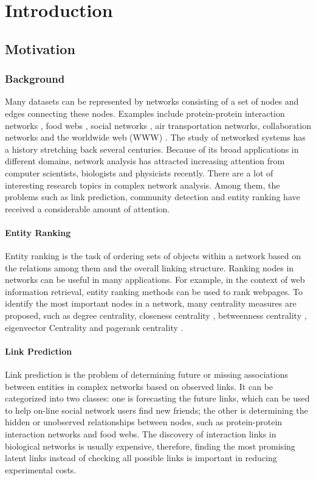 \documentclass[\main/thesis.tex]{subfiles}
\begin{document}
\chapter{Introduction}

\section{Motivation}
\subsection{Background} \label{background}
Many datasets can be represented by networks consisting of a set of nodes and edges connecting these nodes. Examples include protein-protein interaction networks \cite{krogan2006global}, food webs \cite{williams2000simple}, social networks \cite{shetty2004enron}, air transportation networks, collaboration networks \cite{nascimento2003analysis,leskovec2007graph} and the worldwide web (WWW) \cite{albert1999internet,broder2000graph}. The study of networked systems has a history stretching back several centuries. Because of its broad applications in different domains, network analysis has attracted increasing attention from computer scientists, biologists and physicists recently. There are a lot of interesting research topics in complex network analysis. Among them, the problems such as link prediction, community detection and entity ranking have received a considerable amount of attention.

\subsubsection{Entity Ranking}
Entity ranking is the task of ordering sets of objects within a network based on the relations among them and the overall linking structure. Ranking nodes in networks can be useful in many applications. For example, in the context of web information retrieval, entity ranking methods can be used to rank webpages. To identify the most important nodes in a network, many centrality measures are proposed, such as degree centrality, closeness centrality \cite{freeman1978centrality}, betweenness centrality \cite{freeman1977set}, eigenvector Centrality \cite{bonacich1987power} and pagerank centrality \cite{page1999pagerank}.

\subsubsection{Link Prediction}
Link prediction is the problem of determining future or missing associations between entities in complex networks based on observed links. It can be categorized into two classes: one is forecasting the future links, which can be used to help on-line social network users find new friends; the other is determining the hidden or unobserved relationships between nodes, such as protein-protein interaction networks and food webs. The discovery of interaction links in biological networks is usually expensive, therefore, finding the most promising latent links instead of checking all possible links is important in reducing experimental costs.
\end{document}
